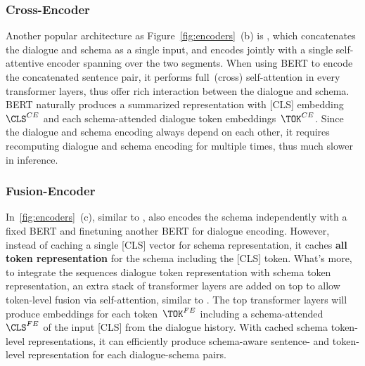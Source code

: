 \subsubsection{Cross-Encoder}
\label{sssec:sgd:cross-encoder}
Another popular architecture as Figure~\ref{fig:encoders}~(b) is \CE,
which concatenates the dialogue and schema as a single input, and
encodes jointly with a single self-attentive encoder spanning over the
two segments.  When using BERT to encode the concatenated sentence
pair, it performs full~(cross) self-attention in every transformer
layers, thus offer rich interaction between the dialogue and
schema. BERT naturally produces a summarized representation with [CLS]
embedding~${\CLS^{CE}}$ and each schema-attended dialogue token
embeddings~${\TOK^{CE}}$. Since the dialogue and schema encoding always
depend on each other, it requires recomputing dialogue and schema
encoding for multiple times, thus much slower in inference.
%

\subsubsection{Fusion-Encoder}
\label{sssec:sgd:fusion-encoer}

In~\autoref{fig:encoders}~(c), similar to \DE, \FE also encodes the
schema independently with a fixed BERT and finetuning another BERT for
dialogue encoding. However, instead of caching a single [CLS] vector for
schema representation, it caches {\bf all token representation} for
the schema including the [CLS] token. What's more, to integrate the
sequences dialogue token representation with schema token
representation, an extra stack of transformer layers are added on top
to allow token-level fusion via self-attention, similar to \CE. The
top transformer layers will produce embeddings for each
token~${\TOK^{FE}}$ including a schema-attended ~${\CLS^{FE}}$ of the
input [CLS] from the dialogue history. With cached schema token-level
representations, it can efficiently produce schema-aware sentence- and
token-level representation for each dialogue-schema pairs.


